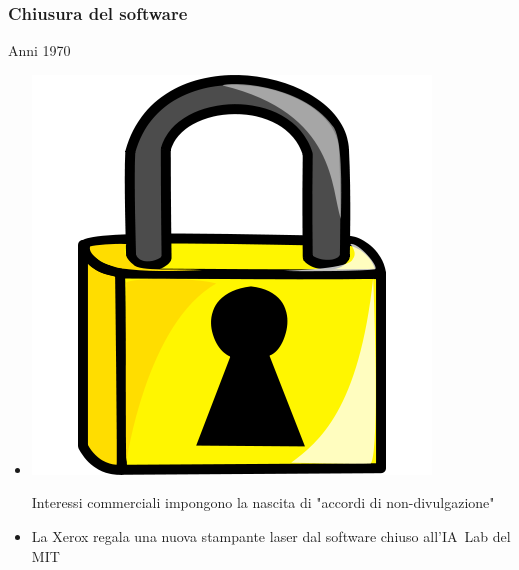 \documentclass{beamer}
\begin{document}
\begin{frame}
\frametitle{Chiusura del software}

    \begin{block}{Anni 1970}
    \begin{itemize}
        \item
        \begin{minipage}{.2\linewidth}
            \includegraphics[width=.9\linewidth]{img/lock.png}
        \end{minipage}
        \begin{minipage}{.7\linewidth}
            Interessi commerciali impongono la nascita di "accordi di non-divulgazione"
        \end{minipage}
        \pause
        \item
        \begin{minipage}{.2\linewidth}
        \end{minipage}
        \begin{minipage}{.7\linewidth}
            La Xerox regala una nuova stampante laser dal software chiuso all'IA~Lab del MIT
        \end{minipage}
    \end{itemize}
    \end{block}
\end{frame}
\end{document}
